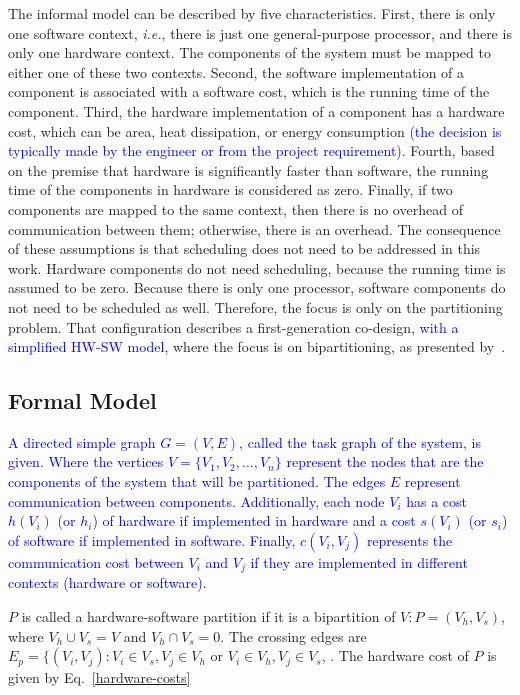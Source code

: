 \documentclass{doublecol-new}
\theoremstyle{TH}{
\newtheorem{lemma}{Lemma}
\newtheorem{theorem}[lemma]{Theorem}
\newtheorem{corrolary}[lemma]{Corrolary}
\newtheorem{conjecture}[lemma]{Conjecture}
\newtheorem{proposition}[lemma]{Proposition}
\newtheorem{claim}[lemma]{Claim}
\newtheorem{stheorem}[lemma]{Wrong Theorem}
\newtheorem{algorithm}{Algorithm}
}
\theoremstyle{THrm}{
\newtheorem{definition}{Definition}[section]
\newtheorem{question}{Question}[section]
\newtheorem{remark}{Remark}
\newtheorem{scheme}{Scheme}
}
\theoremstyle{THhit}{
\newtheorem{case}{Case}[section]
}
\begin{document}
The informal model can be described by five characteristics. First, there is only one software context, {\it i.e.}, there is just one general-purpose processor, and there is only one hardware context. The components of the system must be mapped to either one of these two contexts. Second, the software implementation of a component is associated with a software cost, which is the running time of the component. Third, the hardware implementation of a component has a hardware cost, which can be area, heat dissipation, or energy consumption \textcolor{blue}{(the decision is typically made by the engineer or from the project requirement).} Fourth, based on the premise that hardware is significantly faster than software, the running time of the components in hardware is considered as zero. Finally, if two components are mapped to the same context, then there is no overhead of communication between them; otherwise, there is an overhead. The consequence of these assumptions is that scheduling does not need to be addressed in this work. Hardware components do not need scheduling, because the running time is assumed to be zero. Because there is only one processor, software components do not need to be scheduled as well. Therefore, the focus is only on the partitioning problem. That configuration describes a first-generation co-design, \textcolor{blue}{with a simplified HW-SW model,} where the focus is on bipartitioning, as presented by~\cite{Teich2012}.

\subsection{Formal Model}
\label{Formal-Model}

\textcolor{blue}{A directed simple graph $ G = (V,E) $, called the task graph of the system, is given. Where the vertices $V = \{V_1,V_2,\dotso,V_n\}$ represent the nodes that are the components of the system that will be partitioned. The edges $E$ represent communication between components. Additionally, each node  $V_i$ has a cost $h(V_i)$ (or $h_i$) of hardware if implemented in hardware and a cost $s(V_i)$ (or $ s_i $) of software if implemented in software. Finally, $c(V_i,V_j)$ represents the communication cost between $V_i$ and $V_j$ if they are implemented in different contexts (hardware or software).}

$P$ is called a hardware-software partition if it is a bipartition of $V:P = (V_h, V_s)$, where $V_h \cup V_s = V$  and $V_h \cap V_s = 0$. The crossing edges are $E_p = \{(V_i,V_j):V_i \in V_s, V_j \in V_h$ or $V_i \in V_h, V_j \in V_s $, \cite{Arato2003}. The hardware cost of $P$ is given by Eq.~\eqref{hardware-costs}
\end{document}

